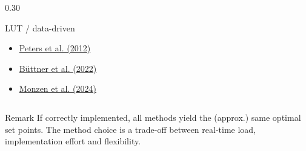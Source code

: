\begin{frame}
\begin{columns}[T,totalwidth=0.98\textwidth]
\begin{column}{0.30\textwidth}
\begin{block}{LUT / data-driven}
                \begin{minipage}[t][0.38\textheight][t]{\linewidth}
                    \begin{itemize}
                        \item \href{https://doi.org/10.1109/IECON.2012.6389438}{Peters et al. (2012)}
                        \item \href{https://www.mdpi.com/1996-1073/15/5/1838}{B\"uttner et al. (2022)}
                        \item \href{https://doi.org/10.1109/OJIES.2024.3356721}{Monzen et al. (2024)}
                    \end{itemize}
                \end{minipage}
            \end{block}
        \end{column}
    \end{columns}\pause%
    \vspace{1mm}
    \begin{varblock}{Remark}
        If correctly implemented, all methods yield the (approx.) same optimal set points. The method choice is a trade-off between real-time load, implementation effort and flexibility.
    \end{varblock}
\end{frame}

